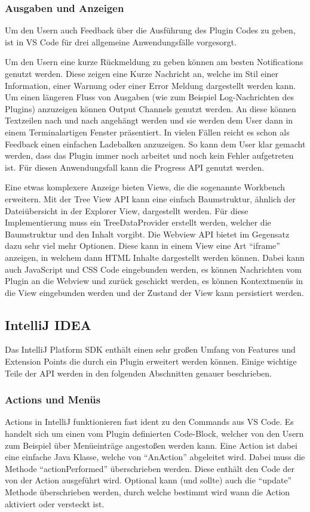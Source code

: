 \subsubsection{Ausgaben und Anzeigen}
  Um den Usern auch Feedback über die Ausführung des Plugin Codes zu geben, 
  ist in VS Code für drei allgemeine Anwendungsfälle vorgesorgt. 
  
  Um den Usern eine kurze 
  Rückmeldung zu geben können am besten Notifications genutzt werden. Diese zeigen eine Kurze 
  Nachricht an, welche im Stil einer Information, einer Warnung oder einer Error Meldung 
  dargestellt werden kann. Um einen längeren Fluss von Ausgaben (wie zum Beispiel Log-Nachrichten 
  des Plugins) anzuzeigen können Output Channels genutzt werden. An diese können Textzeilen nach 
  und nach angehängt werden und sie werden dem User dann in einem Terminalartigen Fenster präsentiert. 
  In vielen Fällen reicht es schon als Feedback einen einfachen Ladebalken anzuzeigen. So kann dem 
  User klar gemacht werden, dass das Plugin immer noch arbeitet und noch kein Fehler aufgetreten 
  ist. Für diesen Anwendungsfall kann die Progress API genutzt werden.

  Eine etwas komplexere Anzeige bieten Views, die die sogenannte Workbench erweitern.
  Mit der Tree View API kann eine einfach Baumstruktur, ähnlich der 
  Dateiübersicht in der Explorer View, dargestellt werden. Für diese Implementierung
  muss ein TreeDataProvider erstellt werden, welcher die Baumstruktur und
  den Inhalt vorgibt. Die Webview API bietet im Gegensatz dazu sehr viel mehr
  Optionen. Diese kann in einem View eine Art \enquote{iframe} anzeigen, in welchem
  dann HTML Inhalte dargestellt werden können. Dabei kann auch JavaScript und CSS Code eingebunden
  werden, es können Nachrichten vom Plugin an die Webview und zurück geschickt werden, 
  es können Kontextmenüs in die View eingebunden werden und der Zustand der View
  kann persistiert werden.

\subsection{IntelliJ IDEA}

Das IntelliJ Platform SDK enthält einen sehr großen Umfang von Features und Extension Points
die durch ein Plugin erweitert werden können. Einige wichtige Teile der API werden in den 
folgenden Abschnitten genauer beschrieben.

\subsubsection{Actions und Menüs}
  Actions in IntelliJ funktionieren fast ident zu den Commands aus VS Code. Es handelt sich um
  einen vom Plugin definierten Code-Block, welcher von den Usern zum Beispiel über Menüeinträge
  angestoßen werden kann. Eine Action ist dabei eine einfache Java Klasse, welche von \enquote{AnAction}
  abgeleitet wird. Dabei muss die Methode \enquote{actionPerformed} überschrieben werden. Diese 
  enthält den Code der von der Action ausgeführt wird. Optional kann (und sollte) auch die
  \enquote{update} Methode überschrieben werden, durch welche bestimmt wird wann die Action 
  aktiviert oder versteckt ist.

